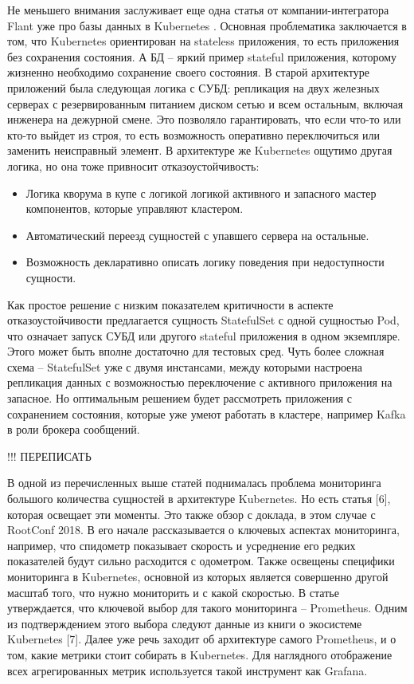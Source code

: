 Не меньшего внимания заслуживает еще одна статья от компании-интегратора Flant уже про базы данных в Kubernetes \cite{habr:flant:db-and-k8s}. Основная проблематика заключается в том, что Kubernetes ориентирован на stateless приложения, то есть приложения без сохранения состояния. А БД
-- яркий пример stateful приложения,
которому жизненно необходимо сохранение своего состояния. В старой архитектуре приложений была следующая логика с СУБД: репликация на двух железных серверах с резервированным питанием диском сетью и всем остальным, включая инженера на дежурной смене. Это позволяло гарантировать, что если что-то или кто-то выйдет из строя, то есть возможность оперативно переключиться или заменить неисправный элемент. В архитектуре же Kubernetes ощутимо другая логика, но она тоже привносит отказоустойчивость:
\begin{itemize}
    \item Логика кворума в купе с логикой логикой активного и запасного мастер компонентов, которые управляют кластером.
    \item Автоматический переезд сущностей с упавшего сервера на остальные.
    \item Возможность декларативно описать логику поведения при недоступности сущности.
\end{itemize}

Как простое решение с низким показателем критичности в аспекте отказоустойчивости предлагается сущность StatefulSet с одной сущностью Pod, что означает запуск СУБД
или другого stateful приложения в одном экземпляре. Этого может быть вполне достаточно для тестовых сред. Чуть более сложная схема -- StatefulSet уже с двумя инстансами, между которыми настроена репликация данных с возможностью переключение с активного приложения на запасное. Но оптимальным решением будет рассмотреть приложения с сохранением состояния, которые уже умеют работать в кластере, например Kafka
в роли брокера сообщений.

!!! ПЕРЕПИСАТЬ

В одной из перечисленных выше статей поднималась проблема мониторинга большого количества сущностей в архитектуре Kubernetes. Но есть статья [6], которая освещает эти моменты. Это также обзор с доклада, в этом случае с RootConf 2018. В его начале рассказывается о ключевых аспектах мониторинга, например, что спидометр показывает скорость и усреднение его редких показателей будут сильно расходится с одометром. Также освещены специфики мониторинга в Kubernetes, основной из которых является совершенно другой масштаб того, что нужно мониторить и с какой скоростью. В статье утверждается, что ключевой выбор для такого мониторинга -- Prometheus. Одним из подтверждением этого выбора следуют данные из книги о экосистеме Kubernetes [7]. Далее уже речь заходит об архитектуре самого Prometheus, и о том, какие метрики стоит собирать в Kubernetes. Для наглядного отображение всех агрегированных метрик используется такой инструмент как Grafana.

